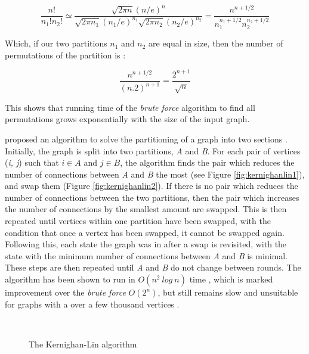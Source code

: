 \begin{equation}
\frac{n!}{n_1!n_2!} \simeq \frac{\sqrt{2\pi n}(n/e)^n}{\sqrt{2\pi n_1}(n_1/e)^{n_1} \sqrt{2\pi n_2}(n_2/e)^{n_2}} = \frac{n^{n+1/2}}{n_1^{n_1+1/2} n_2^{n_2+1/2}} 
\label{eq:partioning1}
\end{equation}

Which, if our two partitions $n_1$ and $n_2$ are equal in size, then the number of permutations of the partition is \cite{newman10}:

\begin{equation}
\frac{n^{n+1/2}}{(n.2)^{n+1}} = \frac{2^{n+1}}{\sqrt{n}}
\label{eq:}
\end{equation}

This shows that running time of the \emph{brute force} algorithm to find all permutations grows exponentially with the size of the input graph.

\citeauthor{kernighan70} proposed an algorithm to solve the partitioning of a graph into two sections \cite{kernighan70}. Initially, the graph is split into two partitions, \emph{A} and \emph{B}. For each pair of vertices (\emph{i, j}) such that $i \in A$ and $j \in B$, the algorithm finds the pair which reduces the number of connections between \emph{A} and \emph{B} the most (see Figure \ref{fig:kernighanlin1}), and swap them (Figure \ref{fig:kernighanlin2}). If there is no pair which reduces the number of connections between the two partitions, then the pair which increases the number of connections by the smallest amount are swapped. This is then repeated until vertices within one partition have been swapped, with the condition that once a vertex has been swapped, it cannot be swapped again. Following this, each state the graph was in after a swap is revisited, with the state with the minimum number of connections between \emph{A} and \emph{B} is minimal. These steps are then repeated until \emph{A} and \emph{B} do not change between rounds. The algorithm has been shown to run in $O(n^2\: log\: n)$ time \cite{kernighan70}, which is marked improvement over the \emph{brute force} $O(2^n)$, but still remains slow and unsuitable for graphs with a over a few thousand vertices \cite{newman10}.

\begin{figure}[htbp]
  \centering
  ~ 
  ~ 
  \caption{The Kernighan-Lin algorithm \cite{newman10}}
  \label{fig:kernighanlin}
\end{figure}

